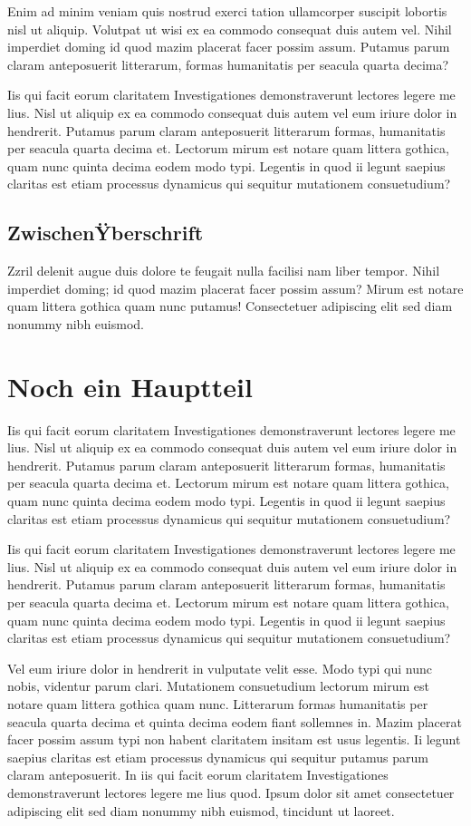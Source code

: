 \documentclass[a4paper,12pt]{scrartcl}
\begin{document}
Enim ad minim veniam quis nostrud exerci tation ullamcorper suscipit lobortis nisl ut aliquip. Volutpat ut wisi ex ea commodo consequat duis autem vel. Nihil imperdiet doming id quod mazim placerat facer possim assum. Putamus parum claram anteposuerit litterarum, formas humanitatis per seacula quarta decima?

Iis qui facit eorum claritatem Investigationes demonstraverunt lectores legere me lius. Nisl ut aliquip ex ea commodo consequat duis autem vel eum iriure dolor in hendrerit. Putamus parum claram anteposuerit litterarum formas, humanitatis per seacula quarta decima et. Lectorum mirum est notare quam littera gothica, quam nunc quinta decima eodem modo typi. Legentis in quod ii legunt saepius claritas est etiam processus dynamicus qui sequitur mutationem consuetudium?

\subsection{ZwischenŸberschrift}
Zzril delenit augue duis dolore te feugait nulla facilisi nam liber tempor. Nihil imperdiet doming; id quod mazim placerat facer possim assum? Mirum est notare quam littera gothica quam nunc putamus! Consectetuer adipiscing elit sed diam nonummy nibh euismod.

\section{Noch ein Hauptteil}
 Iis qui facit eorum claritatem Investigationes demonstraverunt lectores legere me lius. Nisl ut aliquip ex ea commodo consequat duis autem vel eum iriure dolor in hendrerit. Putamus parum claram anteposuerit litterarum formas, humanitatis per seacula quarta decima et. Lectorum mirum est notare quam littera gothica, quam nunc quinta decima eodem modo typi. Legentis in quod ii legunt saepius claritas est etiam processus dynamicus qui sequitur mutationem consuetudium?

 Iis qui facit eorum claritatem Investigationes demonstraverunt lectores legere me lius. Nisl ut aliquip ex ea commodo consequat duis autem vel eum iriure dolor in hendrerit. Putamus parum claram anteposuerit litterarum formas, humanitatis per seacula quarta decima et. Lectorum mirum est notare quam littera gothica, quam nunc quinta decima eodem modo typi. Legentis in quod ii legunt saepius claritas est etiam processus dynamicus qui sequitur mutationem consuetudium?

Vel eum iriure dolor in hendrerit in vulputate velit esse. Modo typi qui nunc nobis, videntur parum clari. Mutationem consuetudium lectorum mirum est notare quam littera gothica quam nunc. Litterarum formas humanitatis per seacula quarta decima et quinta decima eodem fiant sollemnes in. Mazim placerat facer possim assum typi non habent claritatem insitam est usus legentis. Ii legunt saepius claritas est etiam processus dynamicus qui sequitur putamus parum claram anteposuerit. In iis qui facit eorum claritatem Investigationes demonstraverunt lectores legere me lius quod. Ipsum dolor sit amet consectetuer adipiscing elit sed diam nonummy nibh euismod, tincidunt ut laoreet.
\end{document}
